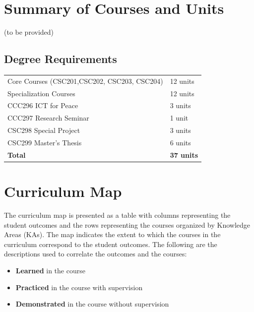 \documentclass[11pt,a4paper]{article}
\begin{document}
{


\newpage

\section{Summary of Courses and Units}
(to be provided)


\subsection*{Degree Requirements}
\begin{center}
\begin{tabular}{ll}
\hline
Core Courses (CSC201,CSC202, CSC203, CSC204) & 12 units \\
Specialization Courses              & 12 units \\
CCC296 ICT for Peace                & 3 units \\
CCC297 Research Seminar             & 1 unit \\
CSC298 Special Project              & 3 units \\
CSC299 Master's Thesis              & 6 units\\
\hline
{\bf Total}                         & {\bf 37 units}
\end{tabular}
\end{center}

\newpage
\section{Curriculum Map}

The curriculum map is presented as a table with columns representing the student outcomes and
the rows representing the courses organized by Knowledge Areas (KAs). The map indicates the
extent to which the courses in the curriculum correspond to the student outcomes. The following
are the descriptions used to correlate the outcomes and the courses:

\begin{itemize}
\item[\textbf{L}] \textbf{Learned} in the course
\item[\textbf{P}] \textbf{Practiced} in the course with supervision
\item[\textbf{D}] \textbf{Demonstrated} in the course without supervision
\end{itemize}

}
\end{document}
